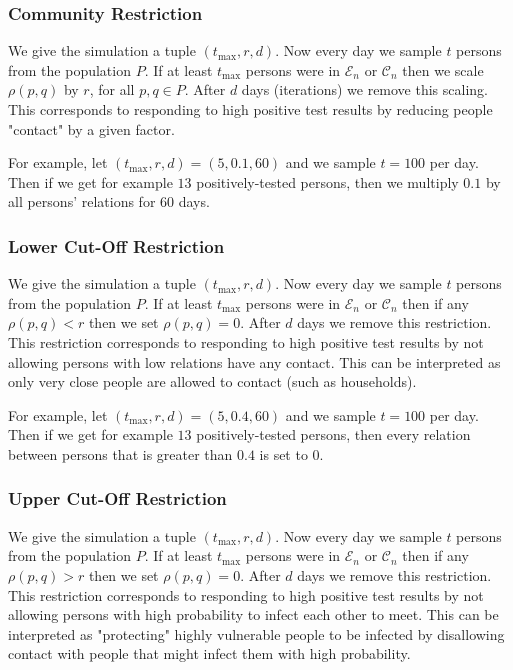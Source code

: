 \documentclass{article}
\newcommand*{\mce}{\mathcal{E}}
\newcommand*{\mcc}{\mathcal{C}}
\begin{document}
\subsubsection{Community Restriction}
We give the simulation a tuple \((t_\text{max}, r, d)\). Now every day we sample \(t\) persons from the population \(P\). If at least \(t_\text{max}\) persons were in \(\mce_n\) or \(\mcc_n\) then we scale \(\rho(p, q)\) by \(r\), for all \(p, q \in P\). After \(d\) days (iterations) we remove this scaling. This corresponds to responding to high positive test results by reducing people "contact" by a given factor.

For example, let \((t_\text{max}, r, d) = (5, 0.1, 60)\) and we sample \(t = 100\) per day. Then if we get for example \(13\) positively-tested persons, then we multiply \(0.1\) by all persons' relations for 60 days.

\subsubsection{Lower Cut-Off Restriction}
We give the simulation a tuple \((t_\text{max}, r, d)\). Now every day we sample \(t\) persons from the population \(P\). If at least \(t_\text{max}\) persons were in \(\mce_n\) or \(\mcc_n\) then if any \(\rho(p,q) < r\) then we set \(\rho(p,q) = 0\). After \(d\) days we remove this restriction. This restriction corresponds to responding to high positive test results by not allowing persons with low relations have any contact. This can be interpreted as only very close people are allowed to contact (such as households).

For example, let \((t_\text{max}, r, d) = (5, 0.4, 60)\) and we sample \(t = 100\) per day. Then if we get for example \(13\) positively-tested persons, then every relation between persons that is greater than \(0.4\) is set to \(0\).

\subsubsection{Upper Cut-Off Restriction}
We give the simulation a tuple \((t_\text{max}, r, d)\). Now every day we sample \(t\) persons from the population \(P\). If at least \(t_\text{max}\) persons were in \(\mce_n\) or \(\mcc_n\) then if any \(\rho(p,q) > r\) then we set \(\rho(p,q) = 0\). After \(d\) days we remove this restriction. This restriction corresponds to responding to high positive test results by not allowing persons with high probability to infect each other to meet. This can be interpreted as "protecting" highly vulnerable people to be infected by disallowing contact with people that might infect them with high probability.
\end{document}
